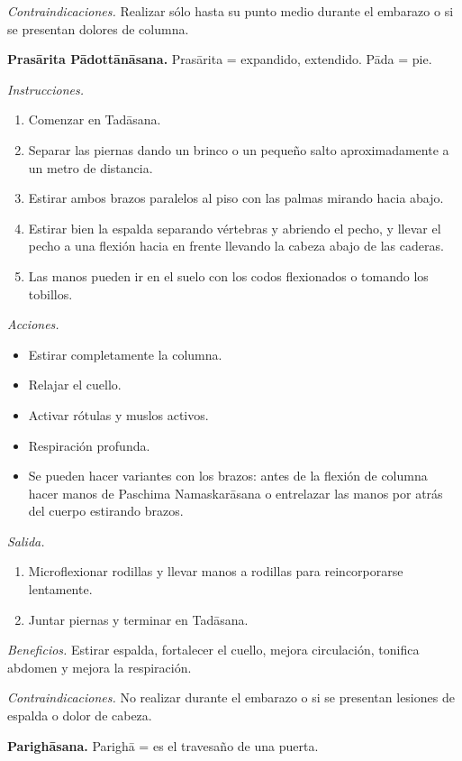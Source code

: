 \emph{Contraindicaciones.} Realizar sólo
hasta su punto medio durante el embarazo o si
se presentan dolores de columna.

\medskip\noindent\textbf{Prasārita
Pādottānāsana.}
Prasārita = expandido, extendido. Pāda = pie.

\emph{Instrucciones.}
\begin{enumerate}
\item Comenzar en Tadāsana.
\item Separar las piernas dando un brinco o
un pequeño salto aproximadamente a un metro
de distancia.
\item Estirar ambos brazos paralelos al piso
con las palmas mirando hacia abajo.
\item Estirar bien la espalda separando
vértebras y abriendo el pecho, y llevar el
pecho a una flexión hacia en frente llevando
la cabeza abajo de las caderas.
\item Las manos pueden ir en el suelo con los
codos flexionados o tomando los tobillos.
\end{enumerate}

\emph{Acciones.}
\begin{itemize}
\item Estirar completamente la columna.
\item Relajar el cuello.
\item Activar rótulas y muslos activos.
\item Respiración profunda.
\item Se pueden hacer variantes con los
brazos: antes de la flexión de columna hacer
manos de Paschima Namaskarāsana o entrelazar
las manos por atrás del cuerpo estirando
brazos.
\end{itemize}

\emph{Salida.}
\begin{enumerate}
\item Microflexionar rodillas y llevar manos
a rodillas para reincorporarse lentamente.
\item Juntar piernas y terminar en Tadāsana.
\end{enumerate}

\emph{Beneficios.} Estirar espalda,
fortalecer el cuello, mejora circulación,
tonifica abdomen y mejora la respiración.

\emph{Contraindicaciones.} No realizar
durante el embarazo o si se presentan
lesiones de espalda o dolor de cabeza.

\medskip\noindent\textbf{Parighāsana.}
Parighā = es el travesaño de una puerta.


